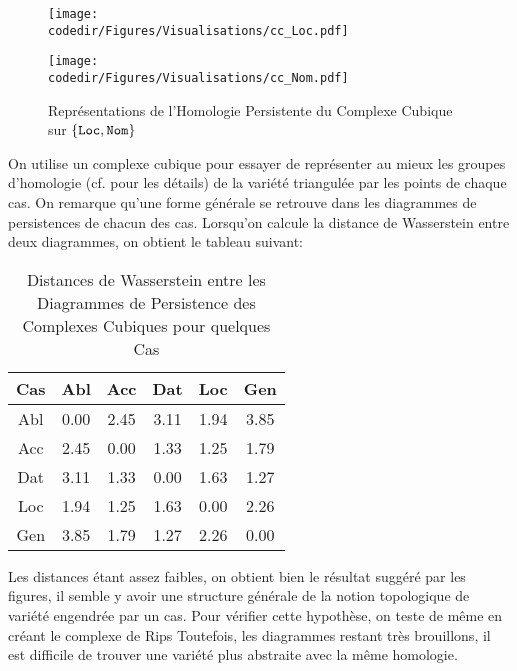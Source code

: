 \begin{figure}[H]
    \begin{minipage}{.5\textwidth}
        \begin{center}
            \texttt{[image: \\codedir/Figures/Visualisations/cc\_Loc.pdf]}
        \end{center}
    \end{minipage}
    \begin{minipage}{.5\textwidth}
        \begin{center}
            \texttt{[image: \\codedir/Figures/Visualisations/cc\_Nom.pdf]}
        \end{center}
    \end{minipage}
    \caption{Représentations de l'Homologie Persistente du Complexe Cubique sur $\{\tt Loc,Nom\}$}
\end{figure}

On utilise un complexe cubique pour essayer de représenter au mieux les groupes d'homologie (cf.  pour les détails) de la variété triangulée par les points de chaque cas.
On remarque qu'une forme générale se retrouve dans les diagrammes de persistences de chacun des cas.
Lorsqu'on calcule la distance de Wasserstein entre deux diagrammes, on obtient le tableau suivant:
\begin{table}[H]
	\centering
	\begin{tabular}{c|ccccc}
		\toprule
		Cas & Abl & Acc & Dat & Loc & Gen\\
		\midrule
		Abl & 0.00 & 2.45 & 3.11 & 1.94 & 3.85\\
		Acc & 2.45 & 0.00 & 1.33 & 1.25 & 1.79\\
		Dat & 3.11 & 1.33 & 0.00 & 1.63 & 1.27\\
		Loc & 1.94 & 1.25 & 1.63 & 0.00 & 2.26\\
		Gen & 3.85 & 1.79 & 1.27 & 2.26 & 0.00\\
		\bottomrule
	\end{tabular}
	\caption{Distances de Wasserstein entre les Diagrammes de Persistence des Complexes Cubiques pour quelques Cas}
\end{table}
Les distances étant assez faibles, on obtient bien le résultat suggéré par les figures, il semble y avoir une structure générale de la notion topologique de variété engendrée par un cas.
Pour vérifier cette hypothèse, on teste de même en créant le complexe de Rips
Toutefois, les diagrammes restant très brouillons, il est difficile de trouver une variété plus abstraite avec la même homologie.

